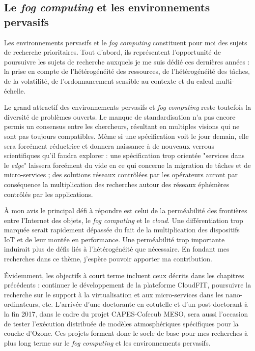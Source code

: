 \subsection*{Le \textit{fog computing} et les environnements pervasifs}

Les environnements pervasifs et le \textit{fog computing} constituent pour moi des sujets de recherche prioritaires. Tout d'abord, ils représentent l'opportunité de poursuivre les sujets de recherche auxquels je me suis dédié ces dernières années : la prise en compte de l'hétérogénéité des ressources, de l'hétérogénéité des tâches, de la volatilité, de l'ordonnancement sensible au contexte et du calcul multi-échelle. 

Le grand attractif des environnements pervasifs et \textit{fog computing} reste toutefois la diversité de problèmes ouverts. Le manque de standardisation n'a pas encore permis un consensus entre les chercheurs, résultant en multiples visions qui ne sont pas toujours compatibles. Même si une spécification voit le jour demain, elle sera forcément réductrice et donnera naissance à de nouveaux verrous scientifiques qu'il faudra explorer : une spécification trop orientée "services dans le \textit{edge}" laissera forcément du vide en ce qui concerne la migration de tâches et de micro-services ; des solutions réseaux contrôlées par les opérateurs auront par conséquence la multiplication des recherches autour des réseaux éphémères contrôlés par les applications. 
 
 À mon avis le principal défi à répondre est celui de la perméabilité des frontières entre l'Internet des objets, le \textit{fog computing} et le \textit{cloud}. Une différentiation trop marquée serait rapidement dépassée du fait de la multiplication des dispositifs IoT et de leur montée en performance. Une perméabilité trop importante induirait plus de défis liés à l'hétérogénéité que nécessaire. En fondant mes recherches dans ce thème, j'espère pouvoir apporter ma contribution.
 
Évidemment, les objectifs à court terme incluent ceux décrits dans les chapitres précédents : continuer le développement de la plateforme CloudFIT, poursuivre la recherche sur le support à la virtualisation et aux micro-services dans les nano-ordinateurs, etc. L'arrivée d'une doctorante en cotutelle et d'un post-doctorant à la fin 2017, dans le cadre du projet CAPES-Cofecub MESO, sera aussi l'occasion de tester l'exécution distribuée de modèles atmosphériques spécifiques pour la couche d'Ozone. Ces projets forment donc le socle de base pour mes recherches à plus long terme sur le \textit{fog computing} et les environnements pervasifs.  

